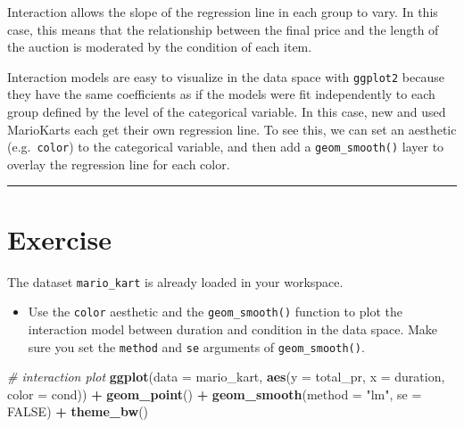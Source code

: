 \documentclass[
]{book}
\newenvironment{Shaded}{\begin{snugshade}}{\end{snugshade}}
\newcommand{\CommentTok}[1]{\textcolor[rgb]{0.56,0.35,0.01}{\textit{#1}}}
\newcommand{\DataTypeTok}[1]{\textcolor[rgb]{0.13,0.29,0.53}{#1}}
\newcommand{\KeywordTok}[1]{\textcolor[rgb]{0.13,0.29,0.53}{\textbf{#1}}}
\newcommand{\NormalTok}[1]{#1}
\newcommand{\OperatorTok}[1]{\textcolor[rgb]{0.81,0.36,0.00}{\textbf{#1}}}
\newcommand{\OtherTok}[1]{\textcolor[rgb]{0.56,0.35,0.01}{#1}}
\newcommand{\StringTok}[1]{\textcolor[rgb]{0.31,0.60,0.02}{#1}}
\providecommand{\tightlist}{%
  \setlength{\itemsep}{0pt}\setlength{\parskip}{0pt}}
\begin{document}
Interaction allows the slope of the regression line in each group to vary. In this case, this means that the relationship between the final price and the length of the auction is moderated by the condition of each item.

Interaction models are easy to visualize in the data space with \texttt{ggplot2} because they have the same coefficients as if the models were fit independently to each group defined by the level of the categorical variable. In this case, new and used MarioKarts each get their own regression line. To see this, we can set an aesthetic (e.g.~\texttt{color}) to the categorical variable, and then add a \texttt{geom\_smooth()} layer to overlay the regression line for each color.

\begin{center}\rule{0.5\linewidth}{0.5pt}\end{center}

\hypertarget{exercise-7}{%
\section*{Exercise}\label{exercise-7}}

The dataset \texttt{mario\_kart} is already loaded in your workspace.

\begin{itemize}
\tightlist
\item
  Use the \texttt{color} aesthetic and the \texttt{geom\_smooth()} function to plot the interaction model between duration and condition in the data space. Make sure you set the \texttt{method} and \texttt{se} arguments of \texttt{geom\_smooth()}.
\end{itemize}

\begin{Shaded}
\begin{Highlighting}[]
\CommentTok{# interaction plot}
\KeywordTok{ggplot}\NormalTok{(}\DataTypeTok{data =}\NormalTok{ mario_kart, }\KeywordTok{aes}\NormalTok{(}\DataTypeTok{y =}\NormalTok{ total_pr, }\DataTypeTok{x =}\NormalTok{ duration, }\DataTypeTok{color =}\NormalTok{ cond)) }\OperatorTok{+}
\StringTok{  }\KeywordTok{geom_point}\NormalTok{() }\OperatorTok{+}\StringTok{ }
\StringTok{  }\KeywordTok{geom_smooth}\NormalTok{(}\DataTypeTok{method =} \StringTok{"lm"}\NormalTok{, }\DataTypeTok{se =} \OtherTok{FALSE}\NormalTok{) }\OperatorTok{+}
\StringTok{  }\KeywordTok{theme_bw}\NormalTok{()}
\end{Highlighting}
\end{Shaded}
\end{document}
